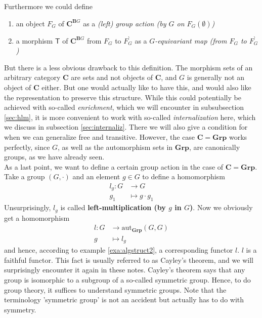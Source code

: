 \begin{exa}
Furthermore we could define
\begin{enumerate}
\item[$\bullet$]
an object $F_{G}$ of $\mathbf{C}^{\mathbf{B}G}$ as a \textit{(left) group action (by $G$ on $F_{G}(\emptyset)$)}
\item[$\bullet$]
a morphism $\mathsf{T}$ of $\mathbf{C}^{\mathbf{B}G}$ from $F_{G}$ to $F_{G}^{\backprime}$ as a \textit{$G$-equivariant map (from $F_{G}$ to $F_{G}^{\backprime}$)}
\end{enumerate}
But there is a less obvious drawback to this definition.
The morphism sets of an arbitrary category $\mathbf{C}$ are sets and not objects of $\mathbf{C}$, and $G$ is generally not an object of $\mathbf{C}$ either.
But one would actually like to have this, and would also like the representation to preserve this structure.
While this could potentially be achieved with so-called \textit{enrichment}, which we will encounter in subsubsection \ref{sec:hlm}, it is more convenient to work with so-called \textit{internalization} here, which we discuss in subsection \ref{sec:internaliz}.
There we will also give a condition for when we can generalize free and transitive.
However, the case $\mathbf{C} = \mathbf{Grp}$ works perfectly, since $G$, as well as the automorphism sets in $\mathbf{Grp}$, are canonically groups, as we have already seen.
\\
As a last point, we want to define a certain group action in the case of $\mathbf{C} = \mathbf{Grp}$.
Take a group $(G,\cdot)$ and an element $g \in G$ to define a homomorphism
\begin{align*}
  l_{g}
  \colon
  G
  &\rightarrow
  G
  \\
  g_{1}
  &\mapsto
  g
  \cdot
  g_{1}
\end{align*}
Unsurprisingly, $l_{g}$ is called \textbf{left-multiplication (by $g$ in $G$)}.
Now we obviously get a homomorphism
\begin{align*}
  l
  \colon
  G
  &\rightarrow
  \mathrm{aut}_{\mathbf{Grp}}(G,G)
  \\
  g
  &\mapsto
  l_{g}
\end{align*}
and hence, according to example \ref{exa:algstruct2}, a corresponding functor $l$.
$l$ is a faithful functor.
This fact is usually referred to as Cayley's theorem, and we will surprisingly encounter it again in these notes.
Cayley's theorem says that any group is isomorphic to a subgroup of a so-called symmetric group.
Hence, to do group theory, it suffices to understand symmetric groups.
Note that the terminology 'symmetric group' is not an accident but actually has to do with symmetry.
\end{exa}
